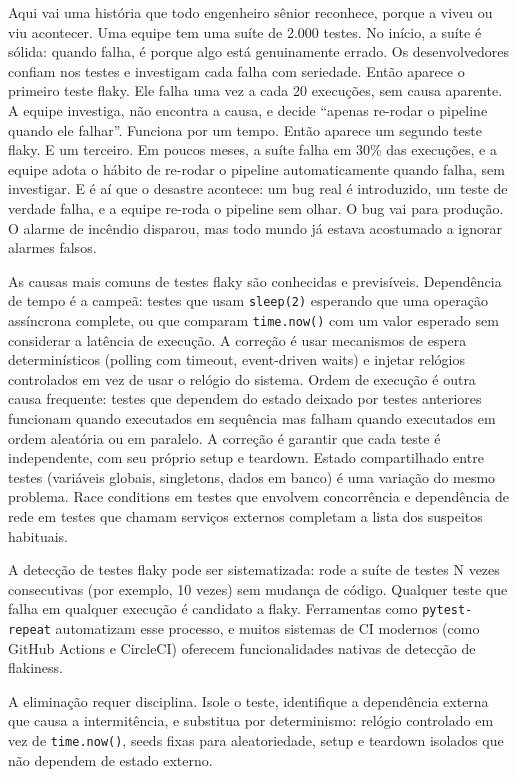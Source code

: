 Aqui vai uma história que todo engenheiro sênior reconhece, porque a viveu ou
viu acontecer. Uma equipe tem uma suíte de 2.000 testes. No início, a suíte é
sólida: quando falha, é porque algo está genuinamente errado. Os desenvolvedores
confiam nos testes e investigam cada falha com seriedade. Então aparece o
primeiro teste flaky. Ele falha uma vez a cada 20 execuções, sem causa aparente.
A equipe investiga, não encontra a causa, e decide ``apenas re-rodar o pipeline
quando ele falhar''. Funciona por um tempo. Então aparece um segundo teste flaky.
E um terceiro. Em poucos meses, a suíte falha em 30\% das execuções, e a equipe
adota o hábito de re-rodar o pipeline automaticamente quando falha, sem
investigar. E é aí que o desastre acontece: um bug real é introduzido, um teste
de verdade falha, e a equipe re-roda o pipeline sem olhar. O bug vai para
produção. O alarme de incêndio disparou, mas todo mundo já estava acostumado a
ignorar alarmes falsos.

As causas mais comuns de testes flaky são conhecidas e previsíveis. Dependência
de tempo é a campeã: testes que usam \texttt{sleep(2)} esperando que uma
operação assíncrona complete, ou que comparam \texttt{time.now()} com um valor
esperado sem considerar a latência de execução. A correção é usar mecanismos de
espera determinísticos (polling com timeout, event-driven waits) e injetar
relógios controlados em vez de usar o relógio do sistema. Ordem de execução é
outra causa frequente: testes que dependem do estado deixado por testes
anteriores funcionam quando executados em sequência mas falham quando executados
em ordem aleatória ou em paralelo. A correção é garantir que cada teste é
independente, com seu próprio setup e teardown. Estado compartilhado entre
testes (variáveis globais, singletons, dados em banco) é uma variação do
mesmo problema. Race conditions em testes que envolvem concorrência e
dependência de rede em testes que chamam serviços externos completam a lista
dos suspeitos habituais.

A detecção de testes flaky pode ser sistematizada: rode a suíte de testes N
vezes consecutivas (por exemplo, 10 vezes) sem mudança de código. Qualquer
teste que falha em qualquer execução é candidato a flaky. Ferramentas como
\texttt{pytest-repeat} automatizam esse processo, e muitos sistemas de CI
modernos (como GitHub Actions e CircleCI) oferecem funcionalidades nativas de
detecção de flakiness.

A eliminação requer disciplina. Isole o teste, identifique a dependência
externa que causa a intermitência, e substitua por determinismo: relógio
controlado em vez de \texttt{time.now()}, seeds fixas para aleatoriedade,
setup e teardown isolados que não dependem de estado externo.


